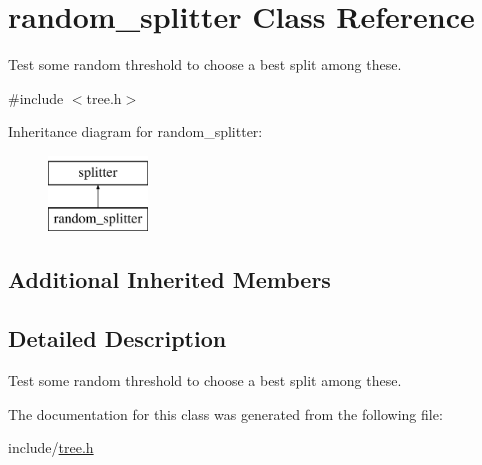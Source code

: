 \hypertarget{classrandom__splitter}{\section{random\+\_\+splitter Class Reference}
\label{classrandom__splitter}
}


Test some random threshold to choose a best split among these.  




{\ttfamily \#include $<$tree.\+h$>$}

Inheritance diagram for random\+\_\+splitter\+:\begin{figure}[H]
\begin{center}
\leavevmode
\includegraphics[height=2.000000cm]{classrandom__splitter}
\end{center}
\end{figure}
\subsection*{Additional Inherited Members}


\subsection{Detailed Description}
Test some random threshold to choose a best split among these. 

The documentation for this class was generated from the following file\+:\begin{DoxyCompactItemize}
\item 
include/\hyperlink{tree_8h}{tree.\+h}\end{DoxyCompactItemize}

